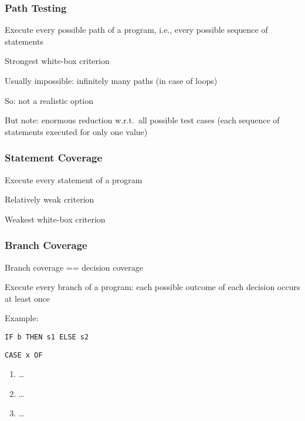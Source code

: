 \subsubsection{Path Testing}

\begin{itemize*}
	\item Execute every possible path of a program, i.e., every possible sequence of statements
	\item Strongest white-box criterion
	\item Usually impossible: infinitely many paths (in case of loops)
	\item So: not a realistic option
	\item But note: enormous reduction w.r.t.\ all possible test cases (each sequence of statements executed for only one value)
\end{itemize*}


\subsubsection{Statement Coverage}

\begin{itemize*}
	\item Execute every statement of a program
	\item Relatively weak criterion
	\item Weakest white-box criterion
\end{itemize*}


\subsubsection{Branch Coverage}

\begin{itemize*}
	\item Branch coverage == decision coverage
	\item Execute every branch of a program: each possible outcome of each decision occurs at least once
	\item Example:
	\begin{itemize*}
		\item \verb|IF b THEN s1 ELSE s2|
		\item \verb|CASE x OF|
		\begin{enumerate}
			\item \ldots
			\item \ldots
			\item \ldots
		\end{enumerate}
	\end{itemize*}
\end{itemize*}

